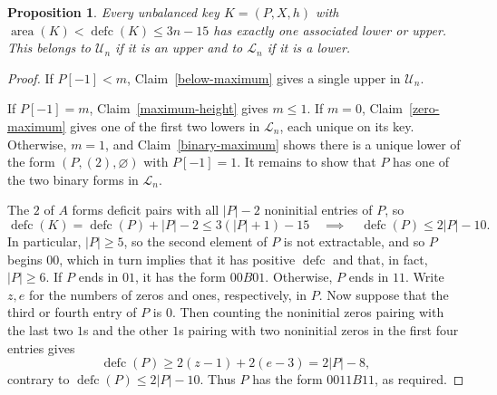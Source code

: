 \documentclass[11pt]{article}
\DeclareMathOperator{\area}{area}\DeclareMathOperator{\dinv}{dinv}
\DeclareMathOperator{\defc}{defc}\DeclareMathOperator{\sym}{sym}
\newtheorem{proposition}[theorem]{Proposition}
\begin{document}
\begin{proposition}\label{exceptions}
Every unbalanced key $K=(P,X,h)$ with $\area(K)<\defc(K)\le3n-15$ has exactly one associated lower or upper. This belongs to $\mathcal U_n$ if it is an upper and to $\mathcal L_n$ if it is a lower.
\end{proposition}
\begin{proof}
If $P[-1]<m$, Claim~\ref{below-maximum} gives a single upper in $\mathcal U_n$.

If $P[-1]=m$, Claim~\ref{maximum-height} gives $m\le1$. If $m=0$, Claim~\ref{zero-maximum} gives one of the first two lowers in $\mathcal L_n$, each unique on its key. Otherwise, $m=1$, and Claim~\ref{binary-maximum} shows there is a unique lower of the form $(P,(2),\varnothing)$ with $P[-1]=1$. It remains to show that $P$ has one of the two binary forms in $\mathcal L_n$.

The $2$ of $A$ forms deficit pairs with all $|P|-2$ noninitial entries of $P$, so
\[
 \defc(K)=\defc(P)+|P|-2\le3(|P|+1)-15
 \quad\implies\quad\defc(P)\le2|P|-10.
\]
In particular, $|P|\ge5$, so the second element of $P$ is not extractable, and so $P$ begins $00$, which in turn implies that it has positive $\defc$ and that, in fact, $|P| \ge 6$. If $P$ ends in $01$, it has the form $00B01$. Otherwise, $P$ ends in $11$. Write $z,e$ for the numbers of zeros and ones, respectively, in $P$. Now suppose that the third or fourth entry of $P$ is $0$. Then counting the noninitial zeros pairing with the last two $1$s and the other $1$s pairing with two noninitial zeros in the first four entries gives
\[
 \defc(P)\ge2(z-1)+2(e-3)=2|P|-8,
\]
contrary to $\defc(P)\le2|P|-10$. Thus $P$ has the form $0011B11$, as required.
\end{proof}
\end{document}
